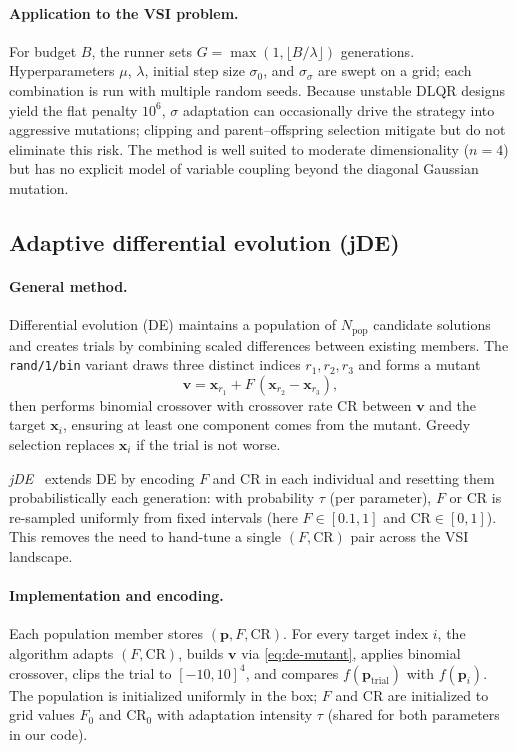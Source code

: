 \documentclass[pdflatex,sn-mathphys-num]{sn-jnl}
\begin{document}
\paragraph{Application to the VSI problem.}
For budget $B$, the runner sets $G=\max(1,\lfloor B/\lambda\rfloor)$ generations.
Hyperparameters $\mu$, $\lambda$, initial step size $\sigma_0$, and $\sigma_\sigma$ are swept on a grid; each combination is run with multiple random seeds.
Because unstable DLQR designs yield the flat penalty $10^6$, $\sigma$ adaptation can occasionally drive the strategy into aggressive mutations; clipping and parent--offspring selection mitigate but do not eliminate this risk.
The method is well suited to moderate dimensionality ($n=4$) but has no explicit model of variable coupling beyond the diagonal Gaussian mutation.

\subsection{Adaptive differential evolution (jDE)}\label{subsec:jde}

\paragraph{General method.}
Differential evolution (DE) maintains a population of $N_{\mathrm{pop}}$ candidate solutions and creates trials by combining scaled differences between existing members.
The \texttt{rand/1/bin} variant draws three distinct indices $r_1,r_2,r_3$ and forms a mutant
\begin{equation}
  \mathbf{v} = \mathbf{x}_{r_1} + F\,(\mathbf{x}_{r_2}-\mathbf{x}_{r_3}),
  \label{eq:de-mutant}
\end{equation}
then performs binomial crossover with crossover rate $\mathrm{CR}$ between $\mathbf{v}$ and the target $\mathbf{x}_i$, ensuring at least one component comes from the mutant.
Greedy selection replaces $\mathbf{x}_i$ if the trial is not worse.

\emph{jDE}~\cite{brest2006self} extends DE by encoding $F$ and $\mathrm{CR}$ in each individual and resetting them probabilistically each generation: with probability $\tau$ (per parameter), $F$ or $\mathrm{CR}$ is re-sampled uniformly from fixed intervals (here $F\in[0.1,1]$ and $\mathrm{CR}\in[0,1]$).
This removes the need to hand-tune a single $(F,\mathrm{CR})$ pair across the VSI landscape.

\paragraph{Implementation and encoding.}
Each population member stores $(\mathbf{p},F,\mathrm{CR})$.
For every target index $i$, the algorithm adapts $(F,\mathrm{CR})$, builds $\mathbf{v}$ via \eqref{eq:de-mutant}, applies binomial crossover, clips the trial to $[-10,10]^4$, and compares $f(\mathbf{p}_{\mathrm{trial}})$ with $f(\mathbf{p}_i)$.
The population is initialized uniformly in the box; $F$ and $\mathrm{CR}$ are initialized to grid values $F_0$ and $\mathrm{CR}_0$ with adaptation intensity $\tau$ (shared for both parameters in our code).
\end{document}
